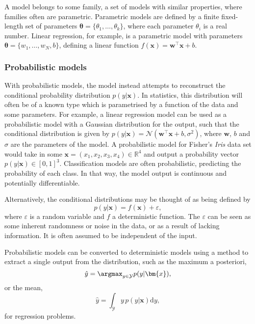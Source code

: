 A model belongs to some family, a set of models with similar properties, where families often are parametric.
Parametric models are defined by a finite fixed-length set of parameters $\bm{\theta}= \{\theta_1, \ldots, \theta_k\}$, where each parameter $\theta_i$ is a real number.
Linear regression, for example, is a parametric model with parameters $\bm{\theta} = \{w_1, \ldots, w_N, b\}$, defining a linear function $f(\bm{x}) = \bm{w}^\top\bm{x} + b$.

\subsubsection{Probabilistic models}
With probabilistic models, the model instead attempts to reconstruct the conditional probability distribution $p(y|\bm{x})$.
In statistics, this distribution will often be of a known type which is parametrised by a function of the data and some parameters.
For example, a linear regression model can be used as a probabilistic model with a Gaussian distribution for the output, such that the conditional distribution is given by $p(y|\bm{x}) = \mathcal{N}(\bm{w}^\top\bm{x} + b, \sigma^2)$, where $\bm{w}$, $b$ and $\sigma$ are the parameters of the model. A probabilistic model for Fisher's \textit{Iris} data set would take in some $\bm{x}=(x_1,x_2,x_3,x_4)\in\mathbb{R}^4$ and output a probability vector $p(y|\bm{x})\in [0,1]^3$.
Classification models are often probabilistic, predicting the probability of each class.
In that way, the model output is continuous and potentially differentiable.

Alternatively, the conditional distributions may be thought of as being defined by
\begin{equation}
    p(y|\bm{x}) = f(\bm{x}) + \varepsilon,
    \label{eq:probabilistic_model}
\end{equation}
where $\varepsilon$ is a random variable and $f$ a deterministic function.
The $\varepsilon$ can be seen as some inherent randomness or noise in the data, or as a result of lacking information.
It is often assumed to be independent of the input.

Probabilistic models can be converted to deterministic models using a method to extract a single output from the distribution, such as the maximum a posteriori,
\begin{equation}
    \hat{y} = \argmax_{y\in\mathcal{Y}} p(y|\bm{x}),
\end{equation}
or the mean,
\begin{equation}
    \hat{y} = \int_{\mathcal{Y}} y \, p(y|\bm{x})\mathrm{d}y,
\end{equation}
for regression problems.

